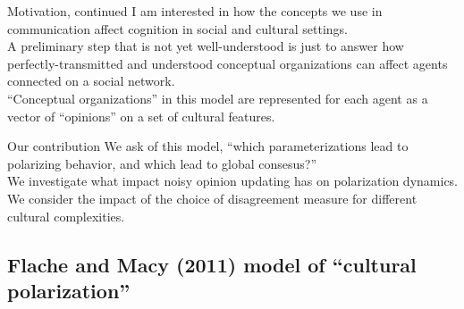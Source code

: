 \documentclass[11pt]{beamer}
\begin{document}
\begin{frame}{Motivation, continued}
  I am interested in how the concepts we use in communication
  affect cognition in social and cultural settings. 
  \\[1em]
  A preliminary step that is not yet
  well-understood is just to answer how perfectly-transmitted
  and understood conceptual organizations can affect agents connected on a 
  social network.
  \\[1em]
  ``Conceptual organizations'' in this model are represented for each agent
  as a vector of ``opinions'' on a set of cultural features.
\end{frame}

\begin{frame}{Our contribution}
  We ask of this model, ``which parameterizations lead to 
  polarizing behavior, and which lead to global consesus?'' 
  \\[1em]
  We investigate what impact noisy opinion updating has on polarization
  dynamics.
  \\[1em]
  We consider the impact of the choice of disagreement measure for different
  cultural complexities.
\end{frame}


\subsection{Flache and Macy (2011) model of ``cultural polarization''}
\end{document}
